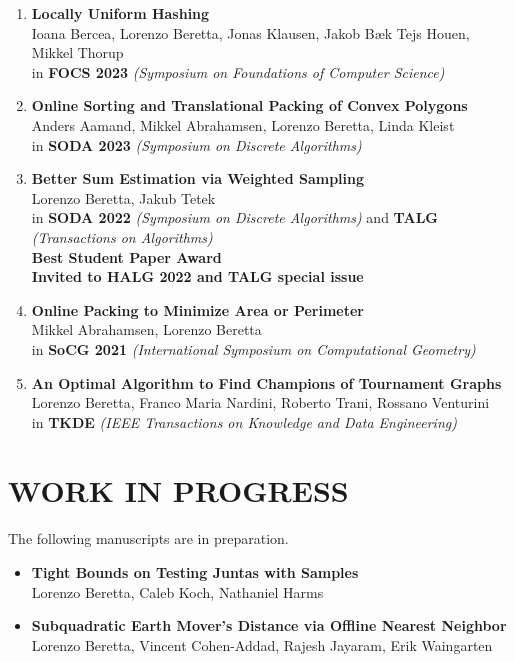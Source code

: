 \documentclass[paper=a4,fontsize=10pt]{scrartcl} %
\newcommand{\NewPart}[1]{\section*{\uppercase{#1}}}
\begin{document}
\begin{enumerate}
    \item \textbf{Locally Uniform Hashing} \\
    Ioana Bercea, Lorenzo Beretta, Jonas Klausen, Jakob Bæk Tejs Houen, Mikkel Thorup \\
    in \textbf{FOCS 2023} \textit{(Symposium on Foundations of Computer Science)}
    
    \item \textbf{Online Sorting and Translational Packing of Convex Polygons} \\
    Anders Aamand, Mikkel Abrahamsen, Lorenzo Beretta, Linda Kleist \\
    in \textbf{SODA 2023} \textit{(Symposium on Discrete Algorithms)}

    \item \textbf{Better Sum Estimation via Weighted Sampling} \\
    Lorenzo Beretta, Jakub Tetek \\ 
    in \textbf{SODA 2022} \textit{(Symposium on Discrete Algorithms)} and \textbf{TALG} \textit{(Transactions on Algorithms)}\\
    \textbf{Best Student Paper Award} \\     \textbf{Invited to HALG 2022 and TALG special issue}
    \label{paper:soda 2022}
    
    \item \textbf{Online Packing to Minimize Area or Perimeter} \\
    Mikkel Abrahamsen, Lorenzo Beretta 
    \\
    in \textbf{SoCG 2021} \textit{(International Symposium on Computational Geometry)}
    
    \item \textbf{An Optimal Algorithm to Find Champions of Tournament Graphs} \\
    Lorenzo Beretta, Franco Maria Nardini, Roberto Trani, Rossano Venturini \\
    in \textbf{TKDE} \textit{(IEEE Transactions on Knowledge and Data Engineering)} \\ 
\end{enumerate}
\nocite{*}
\endgroup

\NewPart{Work in Progress}
The following manuscripts are in preparation.
\begin{itemize}
    \item \textbf{Tight Bounds on Testing Juntas with Samples} \\
Lorenzo Beretta, Caleb Koch, Nathaniel Harms

\item \textbf{Subquadratic Earth Mover's Distance via Offline Nearest Neighbor} \\
Lorenzo Beretta, Vincent Cohen-Addad, Rajesh Jayaram, Erik Waingarten
\end{itemize}
\end{document}
